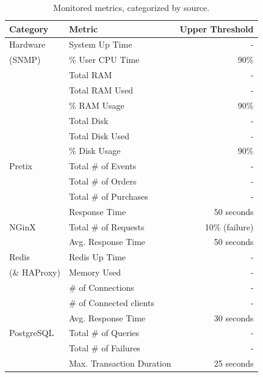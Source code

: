 \documentclass[12pt]{article}
\begin{document}
\begin{table}[H]
  \begin{center}
    \begin{tabular}{l|l|r}
      \hline
      \textbf{Category} & \textbf{Metric}           & \textbf{Upper Threshold} \\
      \hline
      Hardware          & System Up Time            & -                        \\
      (SNMP)            & \% User CPU Time          & 90\%                     \\
                        & Total RAM                 & -                        \\
                        & Total RAM Used            & -                        \\
                        & \% RAM Usage              & 90\%                     \\
                        & Total Disk                & -                        \\
                        & Total Disk Used           & -                        \\
                        & \% Disk Usage             & 90\%                     \\
      \hline
      Pretix            & Total \# of Events        & -                        \\
                        & Total \# of Orders        & -                        \\
                        & Total \# of Purchases     & -                        \\
                        & Response Time             & 50 seconds               \\
      \hline
      NGinX             & Total \# of Requests      & 10\% (failure)           \\
                        & Avg. Response Time        & 50 seconds               \\
      \hline
      Redis             & Redis Up Time             & -                        \\
      (\& HAProxy)      & Memory Used               & -                        \\
                        & \# of Connections         & -                        \\
                        & \# of Connected clients   & -                        \\
                        & Avg. Response Time        & 30 seconds               \\
      \hline
      PostgreSQL        & Total \# of Queries       & -                        \\
                        & Total \# of Failures      & -                        \\
                        & Max. Transaction Duration & 25 seconds               \\
      \hline
    \end{tabular}
    \caption{Monitored metrics, categorized by source.}
    \label{tab:sla}
  \end{center}
\end{table}
\end{document}
